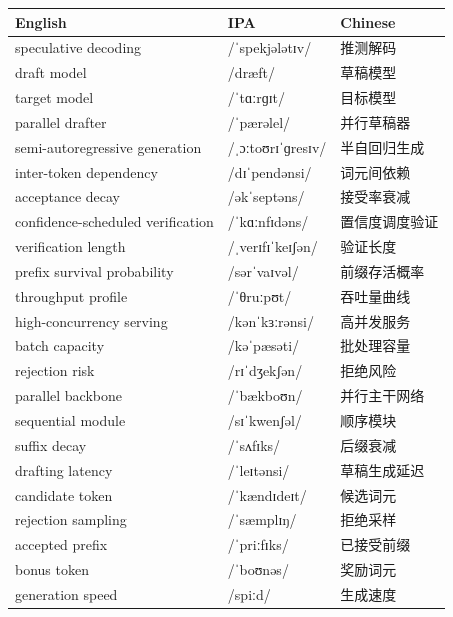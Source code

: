 \documentclass[UTF8,12pt,a4paper]{ctexart}
\providecommand{\zh}[1]{#1}
\begin{document}
\begin{tabular*}{\textwidth}{@{\extracolsep{\fill}}lll@{}}
\toprule
\textbf{English} & \textbf{IPA} & \textbf{Chinese} \\
\midrule
speculative decoding & {\ipafont /ˈspekjələtɪv/} & \zh{推测解码} \\
draft model & {\ipafont /dræft/} & \zh{草稿模型} \\
target model & {\ipafont /ˈtɑːrɡɪt/} & \zh{目标模型} \\
parallel drafter & {\ipafont /ˈpærəlel/} & \zh{并行草稿器} \\
semi-autoregressive generation & {\ipafont /ˌɔːtoʊrɪˈɡresɪv/} & \zh{半自回归生成} \\
inter-token dependency & {\ipafont /dɪˈpendənsi/} & \zh{词元间依赖} \\
acceptance decay & {\ipafont /əkˈseptəns/} & \zh{接受率衰减} \\
confidence-scheduled verification & {\ipafont /ˈkɑːnfɪdəns/} & \zh{置信度调度验证} \\
verification length & {\ipafont /ˌverɪfɪˈkeɪʃən/} & \zh{验证长度} \\
prefix survival probability & {\ipafont /sərˈvaɪvəl/} & \zh{前缀存活概率} \\
throughput profile & {\ipafont /ˈθruːpʊt/} & \zh{吞吐量曲线} \\
high-concurrency serving & {\ipafont /kənˈkɜːrənsi/} & \zh{高并发服务} \\
batch capacity & {\ipafont /kəˈpæsəti/} & \zh{批处理容量} \\
rejection risk & {\ipafont /rɪˈdʒekʃən/} & \zh{拒绝风险} \\
parallel backbone & {\ipafont /ˈbækboʊn/} & \zh{并行主干网络} \\
sequential module & {\ipafont /sɪˈkwenʃəl/} & \zh{顺序模块} \\
suffix decay & {\ipafont /ˈsʌfɪks/} & \zh{后缀衰减} \\
drafting latency & {\ipafont /ˈleɪtənsi/} & \zh{草稿生成延迟} \\
candidate token & {\ipafont /ˈkændɪdeɪt/} & \zh{候选词元} \\
rejection sampling & {\ipafont /ˈsæmplɪŋ/} & \zh{拒绝采样} \\
accepted prefix & {\ipafont /ˈpriːfɪks/} & \zh{已接受前缀} \\
bonus token & {\ipafont /ˈboʊnəs/} & \zh{奖励词元} \\
generation speed & {\ipafont /spiːd/} & \zh{生成速度} \\

\end{tabular*}
\end{document}
